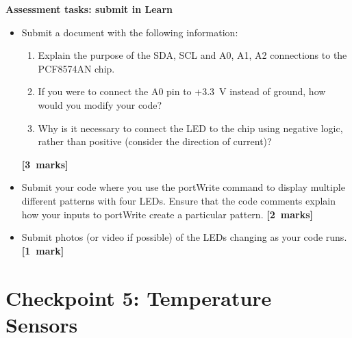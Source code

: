 \newpage
{\bf Assessment tasks: submit in Learn}

\begin{itemize}

\item Submit a document with the following information:
\begin{enumerate}
\item Explain the purpose of the SDA, SCL and A0, A1, A2 connections to the PCF8574AN chip.
\item If you were to connect the A0 pin to +3.3~V instead of ground, how would you modify your code?
\item Why is it necessary to connect the LED to the chip using negative logic, rather than positive (consider the direction of current)?
\end{enumerate}
\hfill {\bf[3~marks]}

\item Submit your code where you use the portWrite command to display multiple different patterns with four LEDs.
Ensure that the code comments explain how your inputs to portWrite create a particular pattern.
\hfill {\bf[2~marks]}

\item Submit photos (or video if possible) of the LEDs changing as your code runs.
\hfill {\bf[1~mark]}

\end{itemize}


\newpage
\section{Checkpoint 5: Temperature Sensors}

